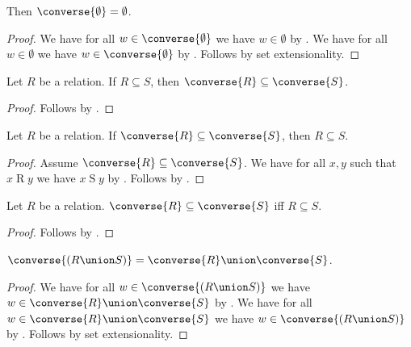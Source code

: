 \begin{proposition}\label{converse_emptyset}
    Then $\converse{\emptyset} = \emptyset$.
\end{proposition}
\begin{proof}
    We have for all $w\in\converse{\emptyset}$ we have $w\in\emptyset$
        by .
    We have for all $w\in\emptyset$ we have $w\in\converse{\emptyset}$
        by .
    Follows by set extensionality.
\end{proof}

\begin{proposition}\label{converse_subseteq_intro}
    Let $R$ be a relation.
    If $R\subseteq S$, then $\converse{R}\subseteq\converse{S}$.
\end{proposition}
\begin{proof}
    Follows by .
\end{proof}

\begin{proposition}\label{converse_subseteq_elim}
    Let $R$ be a relation.
    If $\converse{R}\subseteq\converse{S}$, then $R\subseteq S$.
\end{proposition}
\begin{proof}
    Assume $\converse{R}\subseteq\converse{S}$.
    We have for all $x,y$ such that $x\mathrel{R}y$
        we have $x\mathrel{S}y$
        by .
    Follows by .
\end{proof}

\begin{proposition}\label{converse_subseteq_iff}
    Let $R$ be a relation.
    $\converse{R}\subseteq\converse{S}$ iff $R\subseteq S$.
\end{proposition}
\begin{proof}
    Follows by .
\end{proof}

\begin{proposition}\label{converse_union}
    $\converse{(R\union S)} = \converse{R}\union\converse{S}$.
\end{proposition}
\begin{proof}
    We have for all $w\in\converse{(R\union S)}$
        we have $w\in\converse{R}\union\converse{S}$
        by .
    We have for all $w\in\converse{R}\union\converse{S}$
        we have $w\in\converse{(R\union S)}$
        by .
    Follows by set extensionality.
\end{proof}

